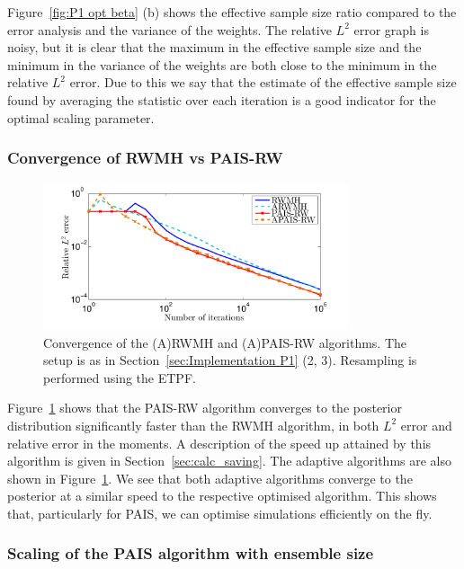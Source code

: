 \documentclass[final]{siamltex}
\begin{document}
Figure~\ref{fig:P1 opt beta} (b) shows the effective sample size ratio
compared to the error analysis and the variance of the weights. The
relative $L^2$ error graph is noisy, but it is clear that the maximum
in the effective sample size and the minimum in the variance of the
weights are both close to the minimum in the relative $L^2$ error. Due
to this we say that the estimate of the effective sample size found by
averaging the statistic over each iteration is a good indicator for
the optimal scaling parameter.


\subsubsection{Convergence of RWMH vs PAIS-RW}

\begin{figure}[htb]
\centering
\includegraphics[width=0.8\textwidth]{"figures/new_G2_l2"}
\caption{Convergence of the (A)RWMH and (A)PAIS-RW algorithms. The
setup is as in Section~\ref{sec:Implementation P1} (2, 3). Resampling
is performed using the ETPF.}
\label{fig:MH1 L2}
\end{figure}

Figure~\ref{fig:MH1 L2} shows that the PAIS-RW algorithm converges
to the posterior distribution significantly faster than the RWMH
algorithm, in both $L^2$ error and relative error in the moments. A
description of the speed up attained by this algorithm is given in
Section~\ref{sec:calc_saving}. The adaptive algorithms are also shown
in Figure~\ref{fig:MH1 L2}. We see that both adaptive algorithms
converge to the posterior at a similar speed to the respective
optimised algorithm. This shows that, particularly for PAIS, we can
optimise simulations efficiently on the fly.


\subsubsection{Scaling of the PAIS algorithm with ensemble size}
\end{document}
